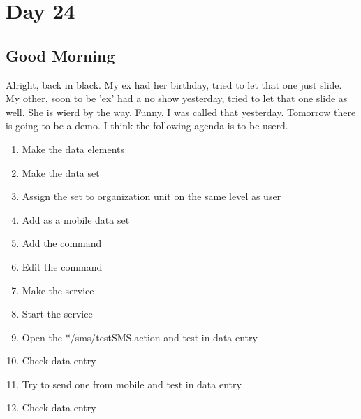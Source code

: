 \section{Day 24}
\subsection{Good Morning}
Alright, back in black.
My ex had her birthday, tried to let that one just slide.
My other, soon to be 'ex' had a no show yesterday, tried to let that one slide as well.
She is wierd by the way. Funny, I was called that yesterday.
Tomorrow there is going to be a demo. I think the following agenda is to be userd.

\begin{enumerate}
\item Make the data elements
\item Make the data set
\item Assign the set to organization unit on the same level as user
\item Add as a mobile data set
\item Add the command
\item Edit the command
\item Make the service
\item Start the service
\item Open the */sms/testSMS.action and test in data entry
\item Check data entry
\item Try to send one from mobile and test in data entry
\item Check data entry
\end{enumerate}

